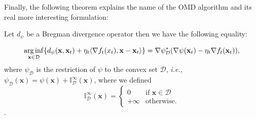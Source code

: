 


Finally, the following theorem explains the name of the OMD algorithm and its real more interesting formulation:

\begin{theorem}\label{th:OMD_mirror}
Let $d_\psi$ be a Bregman divergence operator then we have the following equality:

\begin{equation}
\operatorname*{arg\,inf}\limits_{\mathbf x\in\mathcal D}\{d_\psi(\mathbf x,\mathbf x_t)+\eta_t\langle\nabla f_t(x_t),\mathbf x-\mathbf x_t\rangle\}=\nabla \psi_{\mathcal D}^*(\nabla \psi(\mathbf x_t)-\eta_t\nabla f_t(\mathbf x_t)),
\end{equation}
where $\psi_\mathcal D$ is the restriction of $\psi$ to the convex set $\mathcal D$, \emph{i.e.,} $\psi_\mathcal D(\mathbf x)=\psi(\mathbf x)+\mathbb I^\infty_\mathcal D(\mathbf x)$, where we defined
\begin{equation*}
\mathbb I_\mathcal D^\infty(\mathbf x)=\begin{cases}
0&\text{if $\mathbf x\in\mathcal D$}\\
+\infty&\text{otherwise}.
\end{cases}
\end{equation*}.
\end{theorem}



